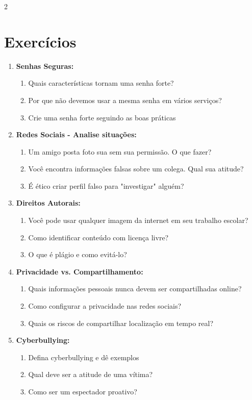 \documentclass[11pt]{article}
\begin{document}
\begin{multicols}{2}
\section*{Exercícios}

\begin{enumerate}[leftmargin=*]

\item \textbf{Senhas Seguras:}
\begin{enumerate}[label=\alph*)]
\item Quais características tornam uma senha forte?
\item Por que não devemos usar a mesma senha em vários serviços?
\item Crie uma senha forte seguindo as boas práticas
\end{enumerate}


\item \textbf{Redes Sociais - Analise situações:}
\begin{enumerate}[label=\alph*)]
\item Um amigo posta foto sua sem sua permissão. O que fazer?
\item Você encontra informações falsas sobre um colega. Qual sua atitude?
\item É ético criar perfil falso para "investigar" alguém?
\end{enumerate}

\item \textbf{Direitos Autorais:}
\begin{enumerate}[label=\alph*)]
\item Você pode usar qualquer imagem da internet em seu trabalho escolar?
\item Como identificar conteúdo com licença livre?
\item O que é plágio e como evitá-lo?
\end{enumerate}

\item \textbf{Privacidade vs. Compartilhamento:}
\begin{enumerate}[label=\alph*)]
\item Quais informações pessoais nunca devem ser compartilhadas online?
\item Como configurar a privacidade nas redes sociais?
\item Quais os riscos de compartilhar localização em tempo real?
\end{enumerate}

\item \textbf{Cyberbullying:}
\begin{enumerate}[label=\alph*)]
\item Defina cyberbullying e dê exemplos
\item Qual deve ser a atitude de uma vítima?
\item Como ser um espectador proativo?
\end{enumerate}


\end{enumerate}
\end{multicols}
\end{document}
